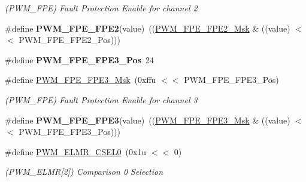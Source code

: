 \begin{DoxyCompactItemize}
\begin{DoxyCompactList}\small\item\em (P\+W\+M\+\_\+\+F\+PE) Fault Protection Enable for channel 2 \end{DoxyCompactList}\item 
\mbox{\label{group__SAMV71__PWM_ga3a562170cbf8ff1723eab2792c2f6590}} 
\#define {\bfseries P\+W\+M\+\_\+\+F\+P\+E\+\_\+\+F\+P\+E2}(value)~((\mbox{\hyperlink{group__SAMV71__PWM_ga3dbe9d68d6f74bdebf54e40585180117}{P\+W\+M\+\_\+\+F\+P\+E\+\_\+\+F\+P\+E2\+\_\+\+Msk}} \& ((value) $<$$<$ P\+W\+M\+\_\+\+F\+P\+E\+\_\+\+F\+P\+E2\+\_\+\+Pos)))
\item 
\mbox{\label{group__SAMV71__PWM_gab088806ad2c20b9973854e3b8a0fd33c}} 
\#define {\bfseries P\+W\+M\+\_\+\+F\+P\+E\+\_\+\+F\+P\+E3\+\_\+\+Pos}~24
\item 
\mbox{\label{group__SAMV71__PWM_gaca9a5e5dcb472caf52d3c2c8b0321657}} 
\#define \mbox{\hyperlink{group__SAMV71__PWM_gaca9a5e5dcb472caf52d3c2c8b0321657}{P\+W\+M\+\_\+\+F\+P\+E\+\_\+\+F\+P\+E3\+\_\+\+Msk}}~(0xffu $<$$<$ P\+W\+M\+\_\+\+F\+P\+E\+\_\+\+F\+P\+E3\+\_\+\+Pos)
\begin{DoxyCompactList}\small\item\em (P\+W\+M\+\_\+\+F\+PE) Fault Protection Enable for channel 3 \end{DoxyCompactList}\item 
\mbox{\label{group__SAMV71__PWM_ga56f3977d54926be1c1452956df6b820f}} 
\#define {\bfseries P\+W\+M\+\_\+\+F\+P\+E\+\_\+\+F\+P\+E3}(value)~((\mbox{\hyperlink{group__SAMV71__PWM_gaca9a5e5dcb472caf52d3c2c8b0321657}{P\+W\+M\+\_\+\+F\+P\+E\+\_\+\+F\+P\+E3\+\_\+\+Msk}} \& ((value) $<$$<$ P\+W\+M\+\_\+\+F\+P\+E\+\_\+\+F\+P\+E3\+\_\+\+Pos)))
\item 
\mbox{\label{group__SAMV71__PWM_ga469a975b28cf04cd35f871f253b7a3b3}} 
\#define \mbox{\hyperlink{group__SAMV71__PWM_ga469a975b28cf04cd35f871f253b7a3b3}{P\+W\+M\+\_\+\+E\+L\+M\+R\+\_\+\+C\+S\+E\+L0}}~(0x1u $<$$<$ 0)
\begin{DoxyCompactList}\small\item\em (P\+W\+M\+\_\+\+E\+L\+MR\mbox{[}2\mbox{]}) Comparison 0 Selection \end{DoxyCompactList}\item 

\end{DoxyCompactItemize}

